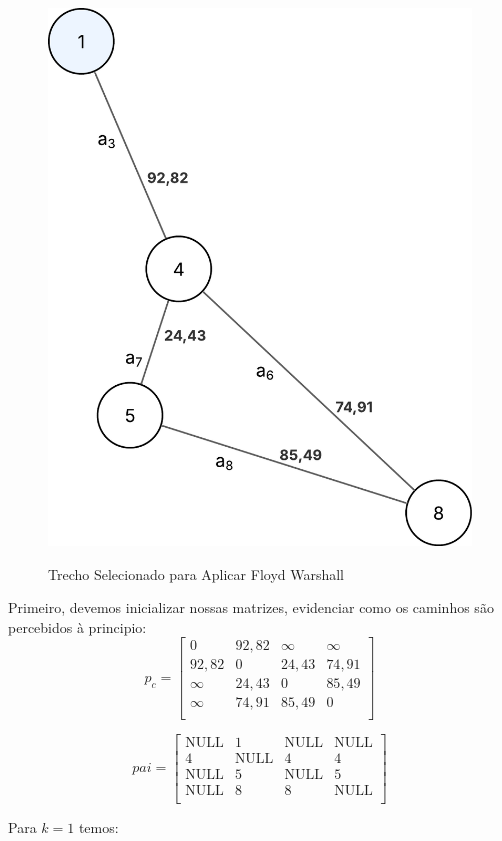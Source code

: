 \begin{figure} [H]
	\centering
	\caption{Trecho Selecionado para Aplicar Floyd Warshall}%
	\label{fig:grafFloydWarshall}%
	\includegraphics[width=0.5\linewidth,angle=0]{figuras/tiposgrafos/grafFloydWarshall.png}%
	\\
\end{figure}
Primeiro, devemos inicializar nossas matrizes, evidenciar como os caminhos são percebidos à principio:
\begin{equation}
	p_c = 
	\begin{bmatrix} \label{eq:matrizCustoFloydWarshall-1}
		0 & 92,82 & \infty & \infty \\%
		92,82 & 0 & 24,43 & 74,91 \\%
		\infty & 24,43 & 0 & 85,49 \\%
		\infty & 74,91 & 85,49 & 0 \\%
	\end{bmatrix}	
\end{equation}

\begin{equation}
	pai = 
\begin{bmatrix} \label{eq:matrizAdjFloydWarshall-1}
	\text{NULL} & 1 & \text{NULL} & \text{NULL} \\%
	4 & \text{NULL} & 4 & 4 \\%
	\text{NULL} & 5 & \text{NULL} & 5 \\%
	\text{NULL} & 8 & 8 & \text{NULL} \\%
\end{bmatrix}
\end{equation}

Para $ k = 1 $ temos:

